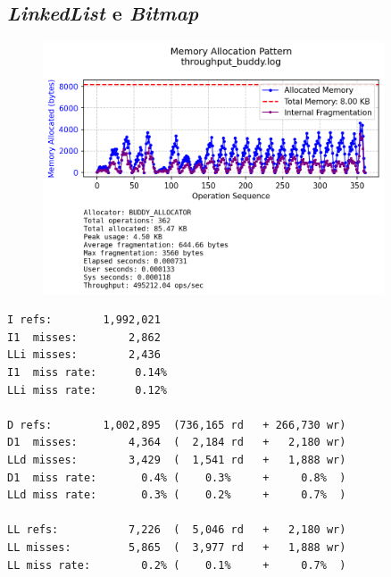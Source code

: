 \subsection{\textit{LinkedList} e \textit{Bitmap}}
\begin{figure}[H]
  \centering
  \includegraphics[width=0.9\textwidth]{graphs/throughput_buddy.png}
  \label{fig:throughput_buddy}
\end{figure}
\begin{lstlisting}[language={}]
I refs:        1,992,021
I1  misses:        2,862
LLi misses:        2,436
I1  miss rate:      0.14%
LLi miss rate:      0.12%

D refs:        1,002,895  (736,165 rd   + 266,730 wr)
D1  misses:        4,364  (  2,184 rd   +   2,180 wr)
LLd misses:        3,429  (  1,541 rd   +   1,888 wr)
D1  miss rate:       0.4% (    0.3%     +     0.8%  )
LLd miss rate:       0.3% (    0.2%     +     0.7%  )

LL refs:           7,226  (  5,046 rd   +   2,180 wr)
LL misses:         5,865  (  3,977 rd   +   1,888 wr)
LL miss rate:        0.2% (    0.1%     +     0.7%  )
\end{lstlisting}

